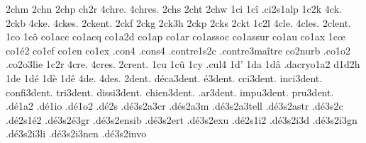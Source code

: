 {2chm
2chn
2chp
ch2r
4chre.
4chres.
2chs
2cht
2chw
1ci
1cî
                    .ci2s1alp
1c2k
4ck.
2ckb
4cke.
4ckes.
2ckent. %
2ckf
2ckg
2ck3h
2ckp
2cks
2ckt
1c2l
4cle.
4cles.
2clent. %
1co
1cô
                    co1acc
                    co1acq
                    co1a2d
                    co1ap
                    co1ar
                    co1assoc
                    co1assur
                    co1au
                    co1ax
1cœ
                    co1é2
                    co1ef
                    co1en
                    co1ex
                    .con4  %
                    .cons4 %
                    .contre1s2c
                    .contre3maître %
                    co2nurb
                    .co1o2
                    .co2o3lie
1c2r
4cre.
4cres.
2crent. %
1cu
1cû
1cy
.cul4 %
1d'
1da
1dâ
                    .dacryo1a2
d1d2h
1de
1dé
1dè
1dê
4de.
4des.
     2dent.
 déca3dent.
    é3dent.
  cci3dent.
 inci3dent.
confi3dent.
  tri3dent.
dissi3dent.
chien3dent.
  .ar3dent.
 impu3dent.
  pru3dent.
%
                    .dé1a2
                    .dé1io
                    .dé1o2
                    .dé2s %
                    .dé3s2a3cr
                    .dés2a3m %
                    .dé3s2a3tell
                    .dé3s2astr
                    .dé3s2c %
                    .dé2s1é2
                    .dé3s2é3gr
                    .dé3s2ensib
                    .dé3s2ert
                    .dé3s2exu
                    .dé2s1i2
                    .dé3s2i3d
                    .dé3s2i3gn
                    .dé3s2i3li
                    .dé3s2i3nen
                    .dé3s2invo
}
